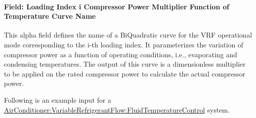\paragraph{Field: Loading Index i Compressor Power Multiplier Function of Temperature Curve Name}

This alpha field defines the name of a BiQuadratic curve for the VRF operational mode corresponding to the i-th loading index. It parameterizes the variation of compressor power as a function of operating conditions, i.e., evaporating and condensing temperatures. The output of this curve is a dimensionless multiplier to be applied on the rated compressor power to calculate the actual compressor power.

Following is an example input for a \hyperref[airconditionervariablerefrigerantflowfluidtemperaturecontrol]{AirConditioner:VariableRefrigerantFlow:FluidTemperatureControl} system.

